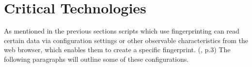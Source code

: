 \section{Critical Technologies} \label{sec:technologies}

As mentioned in the previous sections scripts which use fingerprinting can read certain data via configuration settings or other observable characteristics from the web browser, which enables them to create a specific fingerprint. (\textcite{doty18}, p.3) The following paragraphs will outline some of these configurations. 

